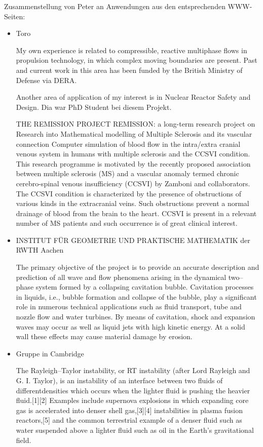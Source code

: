 Zusammenstellung von Peter an Anwendungen aus den entsprechenden
WWW-Seiten:

\begin{itemize}
\item Toro

My own experience is related to compressible, reactive multiphase
flows in propulsion technology, in which complex moving boundaries are
present. Past and current work in this area has been funded by the
British Ministry of Defense via DERA.

Another area of application of my interest is in Nuclear Reactor
Safety and Design. Dia war PhD Student bei diesem Projekt.

THE REMISSION PROJECT REMISSION: a long-term research project on
Research into Mathematical modelling of Multiple Sclerosis and its
vascular connection Computer simulation of blood flow in the
intra/extra cranial venous system in humans with multiple sclerosis
and the CCSVI condition. This research programme is motivated by the
recently proposed association between multiple sclerosis (MS) and a
vascular anomaly termed chronic cerebro-spinal venous insufficiency
(CCSVI) by Zamboni and collaborators. The CCSVI condition is
characterized by the presence of obstructions of various kinds in the
extracranial veins. Such obstructions prevent a normal drainage of
blood from the brain to the heart. CCSVI is present in a relevant
number of MS patients and such occurrence is of great clinical
interest.

\item INSTITUT FÜR GEOMETRIE UND PRAKTISCHE MATHEMATIK der RWTH Aachen

The primary objective of the project is to provide an accurate
description and prediction of all wave and flow phenomena arising in
the dynamical two--phase system formed by a collapsing cavitation
bubble. Cavitation processes in liquids, i.e., bubble formation and
collapse of the bubble, play a significant role in numerous technical
applications such as fluid transport, tube and nozzle flow and water
turbines. By means of cavitation, shock and expansion waves may occur
as well as liquid jets with high kinetic energy. At a solid wall these
effects may cause material damage by erosion.

\item Gruppe in Cambridge

The Rayleigh–Taylor instability, or RT instability (after Lord
Rayleigh and G. I. Taylor), is an instability of an interface between
two fluids of differentdensities which occurs when the lighter fluid
is pushing the heavier fluid.[1][2] Examples include supernova
explosions in which expanding core gas is accelerated into denser
shell gas,[3][4] instabilities in plasma fusion reactors,[5] and the
common terrestrial example of a denser fluid such as water suspended
above a lighter fluid such as oil in the Earth's gravitational field.


\end{itemize}
